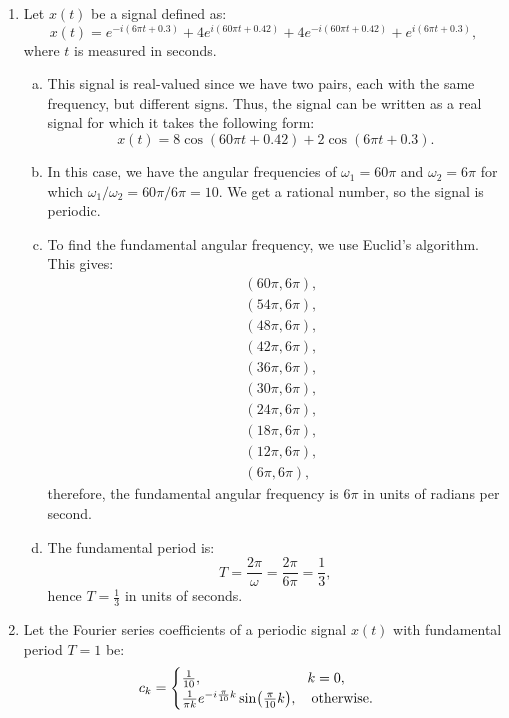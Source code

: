 \begin{enumerate}
  \item Let $x(t)$ be a signal defined as:
        \[ x(t) = e^{-i(6\pi t+0.3)} + 4e^{i(60\pi t+0.42)} + 4e^{-i(60\pi t+0.42)} + e^{i(6\pi t+0.3)}, \]
        where $t$ is measured in seconds.
        \begin{enumerate}[a)]
          \item This signal is real-valued since we have two pairs, each with the same frequency, but different signs. Thus, the signal can be written as a real signal for which it takes the following form:
                \[ x(t) = 8\cos(60\pi t + 0.42) + 2\cos(6\pi t + 0.3). \]
          \item In this case, we have the angular frequencies of $\omega_{1}=60\pi$ and $\omega_{2}=6\pi$ for which $\omega_{1}/\omega_{2}=60\pi/6\pi=10$. We get a rational number, so the signal is periodic.
          \item To find the fundamental angular frequency, we use Euclid's algorithm. This gives:
                \begin{align*}
                   & (60\pi,6\pi), \\
                   & (54\pi,6\pi), \\
                   & (48\pi,6\pi), \\
                   & (42\pi,6\pi), \\
                   & (36\pi,6\pi), \\
                   & (30\pi,6\pi), \\
                   & (24\pi,6\pi), \\
                   & (18\pi,6\pi), \\
                   & (12\pi,6\pi), \\
                   & (6\pi,6\pi),
                \end{align*}
                therefore, the fundamental angular frequency is $6\pi$ in units of radians per second.

          \item The fundamental period is:
                \[ T = \frac{2\pi}{\omega} = \frac{2\pi}{6\pi}=\frac{1}{3}, \]
                hence $T=\frac{1}{3}$ in units of seconds.
        \end{enumerate}

  \item Let the Fourier series coefficients of a periodic signal $x(t)$ with fundamental period $T=1$ be:
        \[c_{k} = \begin{cases}
            \frac{1}{10}, \hspace{2.3cm}\quad k=0, \\
            \frac{1}{\pi k}e^{-i\frac{\pi}{10}k}\sin(\frac{\pi}{10}k),\quad \text{otherwise}.
          \end{cases}\]


\end{enumerate}
